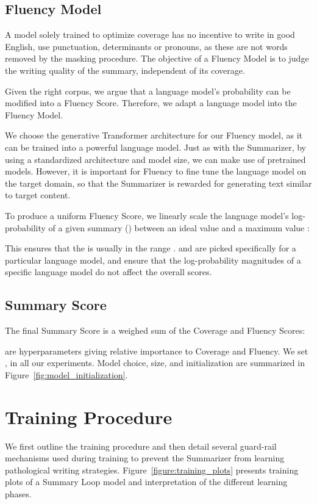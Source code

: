 \documentclass[11pt,a4paper]{article}
\begin{document}
\subsection{Fluency Model}
\label{section:fluencymodel}

A model solely trained to optimize coverage has no incentive to write in good English, use punctuation, determinants or pronouns, as these are not words removed by the masking procedure. The objective of a Fluency Model is to judge  the writing quality of the summary, independent of its coverage.

Given the right corpus, we argue that a language model's probability can be modified into a Fluency Score. Therefore, we adapt a language model into the Fluency Model.

We choose the generative Transformer \cite{radford2019language} architecture for our Fluency model, as it can be trained into a powerful language model. Just as with the Summarizer, by using a standardized architecture and model size, we can make use of pretrained models. However, it is important for Fluency to fine tune the language model on the target domain, so that the Summarizer is rewarded for generating text similar to target content.

To produce a uniform Fluency Score, we linearly scale the language model's log-probability of a given summary () between an ideal value  and a maximum value :

This ensures that the  is usually in the range .  and  are picked specifically for a particular language model, and ensure that the log-probability magnitudes of a specific language model do not affect the overall scores.

\subsection{Summary Score}

The final Summary Score is a weighed sum of the Coverage and Fluency Scores:

 are hyperparameters giving relative importance to Coverage and Fluency. We set ,  in all our experiments. Model choice, size, and initialization are summarized in Figure~\ref{fig:model_initialization}.

\section{Training Procedure}
\label{section:training}
We first outline the training procedure and then detail several guard-rail mechanisms used during training to prevent the Summarizer from learning pathological writing strategies. 
Figure~\ref{figure:training_plots} presents training plots of a Summary Loop model and interpretation of the different learning phases.
\end{document}
